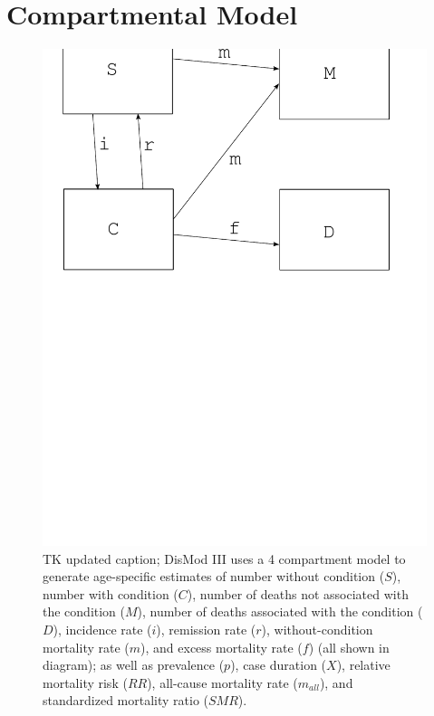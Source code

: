 \section{Compartmental Model}
\begin{figure}
\begin{center}
\includegraphics[width=\textwidth]{compartments.pdf}
\end{center}
\caption{TK updated caption; DisMod III uses a 4 compartment model to generate
  age-specific estimates of number without condition ($S$), number
  with condition ($C$), number of deaths not associated with the condition ($M$),
  number of deaths associated with the condition ($D$), incidence rate ($i$),
  remission rate ($r$), without-condition mortality rate ($m$), and
  excess mortality rate ($f$) (all shown in diagram); as well as
  prevalence ($p$), case duration ($X$), relative mortality risk ($RR$), all-cause mortality
  rate ($m_{all}$), and standardized mortality ratio ($SMR$).}
\label{fig:compartmental-model}
\end{figure}

